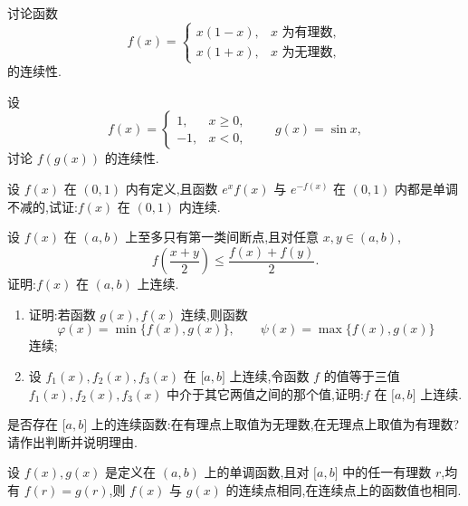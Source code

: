 \documentclass[../数学分析培优讲义.tex]{subfiles}
\begin{document}
\begin{example}
讨论函数
\[
f(x)=
\begin{cases}
    x(1-x), & x\text{ 为有理数},\\
    x(1+x), & x\text{ 为无理数},
\end{cases}
\]
的连续性.
\end{example}
\exampleblank

\begin{example}
设
\[
f(x)=
\begin{cases}
    1, & x\geq0,\\
    -1, & x<0,
\end{cases}
\qquad g(x)=\sin x,
\]
讨论 $f(g(x))$ 的连续性.
\end{example}
\exampleblank

\begin{example}
设 $f(x)$ 在 $(0,1)$ 内有定义,且函数 $e^x f(x)$ 与 $e^{-f(x)}$ 在 $(0,1)$ 内都是单调不减的,试证:$f(x)$ 在 $(0,1)$ 内连续.
\end{example}
\exampleblank

\begin{example}
设 $f(x)$ 在 $(a,b)$ 上至多只有第一类间断点,且对任意 $x,y\in(a,b)$,
\[
    f\left(\dfrac{x+y}{2}\right)\leq\dfrac{f(x)+f(y)}{2}.
\]
证明:$f(x)$ 在 $(a,b)$ 上连续.
\end{example}
\exampleblank

\begin{example}[\markstar]
\begin{enumerate}[label=(\arabic*)]
    \item 证明:若函数 $g(x),f(x)$ 连续,则函数
    \[
        \varphi(x)=\min\{f(x),g(x)\},
        \qquad
        \psi(x)=\max\{f(x),g(x)\}
    \]
    连续;
    \item 设 $f_1(x),f_2(x),f_3(x)$ 在 $\lbrack a,b\rbrack$ 上连续,令函数 $f$ 的值等于三值 $f_1(x),f_2(x),f_3(x)$ 中介于其它两值之间的那个值,证明:$f$ 在 $\lbrack a,b\rbrack$ 上连续.
\end{enumerate}
\end{example}
\exampleblank

\begin{example}
是否存在 $\lbrack a,b\rbrack$ 上的连续函数:在有理点上取值为无理数,在无理点上取值为有理数?请作出判断并说明理由.
\end{example}
\exampleblank

\begin{example}
设 $f(x),g(x)$ 是定义在 $(a,b)$ 上的单调函数,且对 $\lbrack a,b\rbrack$ 中的任一有理数 $r$,均有 $f(r)=g(r)$,则 $f(x)$ 与 $g(x)$ 的连续点相同,在连续点上的函数值也相同.
\end{example}
\exampleblank
\end{document}
